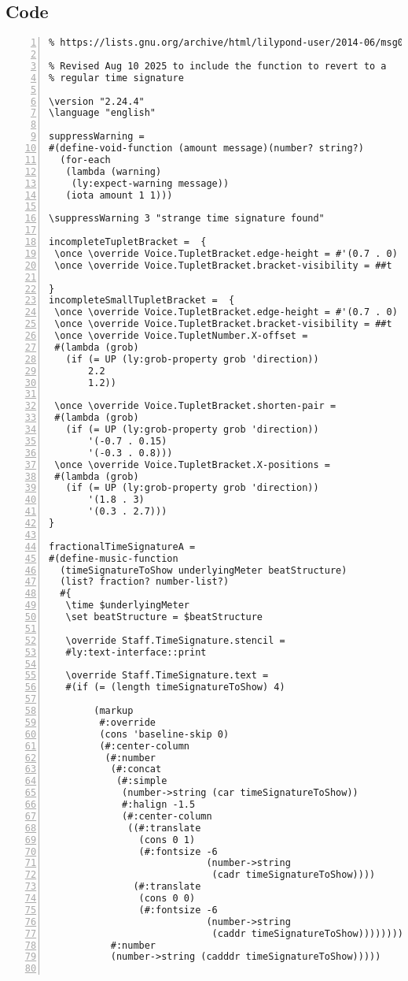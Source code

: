 \subsection{Code}
\begin{Verbatim}[numbers=left,xleftmargin=5mm]
% Inspired by:
% https://lists.gnu.org/archive/html/lilypond-user/2014-06/msg00209.html

% Revised Aug 10 2025 to include the function to revert to a
% regular time signature

\version "2.24.4"
\language "english"

suppressWarning =
#(define-void-function (amount message)(number? string?)
  (for-each
   (lambda (warning)
    (ly:expect-warning message))
   (iota amount 1 1)))

\suppressWarning 3 "strange time signature found"

incompleteTupletBracket =  {
 \once \override Voice.TupletBracket.edge-height = #'(0.7 . 0)
 \once \override Voice.TupletBracket.bracket-visibility = ##t

}
incompleteSmallTupletBracket =  {
 \once \override Voice.TupletBracket.edge-height = #'(0.7 . 0)
 \once \override Voice.TupletBracket.bracket-visibility = ##t
 \once \override Voice.TupletNumber.X-offset =
 #(lambda (grob)
   (if (= UP (ly:grob-property grob 'direction))
       2.2
       1.2))

 \once \override Voice.TupletBracket.shorten-pair =
 #(lambda (grob)
   (if (= UP (ly:grob-property grob 'direction))
       '(-0.7 . 0.15)
       '(-0.3 . 0.8)))
 \once \override Voice.TupletBracket.X-positions =
 #(lambda (grob)
   (if (= UP (ly:grob-property grob 'direction))
       '(1.8 . 3)
       '(0.3 . 2.7)))
}

fractionalTimeSignatureA =
#(define-music-function
  (timeSignatureToShow underlyingMeter beatStructure)
  (list? fraction? number-list?)
  #{
   \time $underlyingMeter
   \set beatStructure = $beatStructure

   \override Staff.TimeSignature.stencil =
   #ly:text-interface::print

   \override Staff.TimeSignature.text =
   #(if (= (length timeSignatureToShow) 4)

        (markup
         #:override
         (cons 'baseline-skip 0)
         (#:center-column
          (#:number
           (#:concat
            (#:simple
             (number->string (car timeSignatureToShow))
             #:halign -1.5
             (#:center-column
              ((#:translate
                (cons 0 1)
                (#:fontsize -6
                            (number->string
                             (cadr timeSignatureToShow))))
               (#:translate
                (cons 0 0)
                (#:fontsize -6
                            (number->string
                             (caddr timeSignatureToShow))))))))
           #:number
           (number->string (cadddr timeSignatureToShow)))))


\end{Verbatim}
